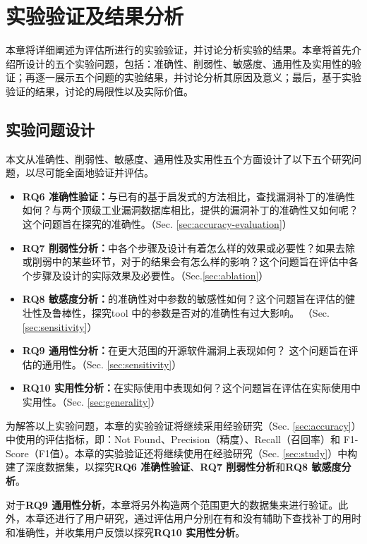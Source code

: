 \chapter{实验验证及结果分析}

本章将详细阐述为评估\tool 所进行的实验验证，并讨论分析实验的结果。本章将首先介绍所设计的五个实验问题，包括：准确性、削弱性、敏感度、通用性及实用性的验证；再逐一展示五个问题的实验结果，并讨论分析其原因及意义；最后，基于实验验证的结果，讨论\tool 的局限性以及实际价值。

\section{实验问题设计}
本文从准确性、削弱性、敏感度、通用性及实用性五个方面设计了以下五个研究问题，以尽可能全面地验证并评估\tool 。

\begin{itemize}[leftmargin=*]
\item \textbf{RQ6 准确性验证：}与已有的基于启发式的方法相比，\tool 查找漏洞补丁的准确性如何？与两个顶级工业漏洞数据库相比，\tool 提供的漏洞补丁的准确性又如何呢？这个问题旨在探究\tool 的准确性。（Sec. \ref{sec:accuracy-evaluation}）
\item \textbf{RQ7 削弱性分析：}\tool 中各个步骤及设计有着怎么样的效果或必要性？如果去除或削弱\tool 中的某些环节，对于\tool 的结果会有怎么样的影响？这个问题旨在评估\tool 中各个步骤及设计的实际效果及必要性。（Sec.\ref{sec:ablation}）
\item \textbf{RQ8 敏感度分析：}\tool 的准确性对\tool 中参数的敏感性如何？这个问题旨在评估\tool 的健壮性及鲁棒性，探究tool 中的参数是否对\tool 的准确性有过大影响。 （Sec. \ref{sec:sensitivity}）
\item \textbf{RQ9 通用性分析：}\tool 在更大范围的开源软件漏洞上表现如何？ 这个问题旨在评估\tool 的通用性。（Sec. \ref{sec:sensitivity}）
\item \textbf{RQ10 实用性分析：}\tool 在实际使用中表现如何？这个问题旨在评估\tool 在实际使用中实用性。（Sec. \ref{sec:generality}）
\end{itemize}

为解答以上实验问题，本章的实验验证将继续采用经验研究（Sec. \ref{sec:accuracy}）中使用的评估指标，即：Not Found、Precision（精度）、Recall（召回率）和 F1-Score（F1值）。本章的实验验证还将继续使用在经验研究（Sec. \ref{sec:study}）中构建了深度数据集，以探究\textbf{RQ6 准确性验证}、\textbf{RQ7 削弱性分析}和\textbf{RQ8 敏感度分析}。

对于\textbf{RQ9 通用性分析}，本章将另外构造两个范围更大的数据集来进行验证。此外，本章还进行了用户研究，通过评估用户分别在有和没有\tool 辅助下查找补丁的用时和准确性，并收集用户反馈以探究\textbf{RQ10 实用性分析}。


